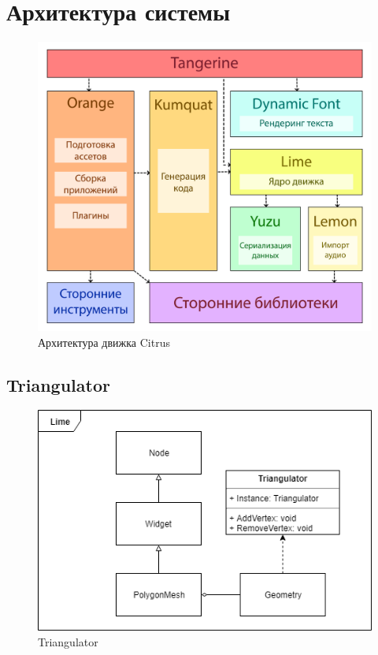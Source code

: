 \documentclass{fefu}
\begin{document}
\section{Архитектура системы}
\begin{figure}[H]
    \centering
    \includegraphics[scale=0.25]{images/CitrusArchitecture.png}
    \caption{Архитектура движка Citrus}
    \label{CitrusArchitecture}
\end{figure}
\subsection{Triangulator}
\begin{figure}[H]
    \centering
    \includegraphics{images/TriangulatorArchitecture.png}
    \caption{Triangulator}
    \label{TriangulatorArchitecture}
\end{figure}
\end{document}
